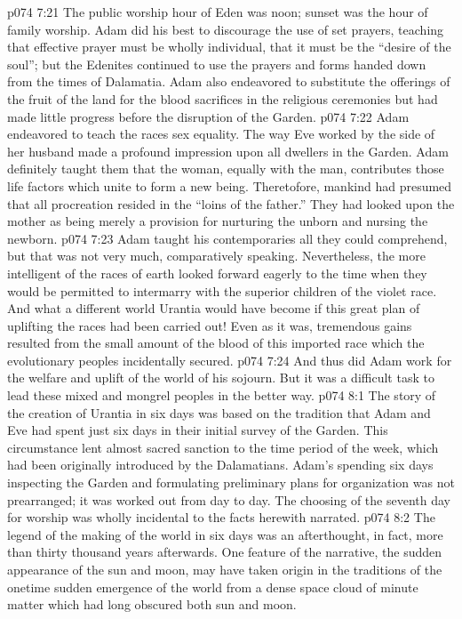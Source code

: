 \vs p074 7:21 The public worship hour of Eden was noon; sunset was the hour of family worship. Adam did his best to discourage the use of set prayers, teaching that effective prayer must be wholly individual, that it must be the “desire of the soul”; but the Edenites continued to use the prayers and forms handed down from the times of Dalamatia. Adam also endeavored to substitute the offerings of the fruit of the land for the blood sacrifices in the religious ceremonies but had made little progress before the disruption of the Garden.
\pc \vs p074 7:22 Adam endeavored to teach the races sex equality. The way Eve worked by the side of her husband made a profound impression upon all dwellers in the Garden. Adam definitely taught them that the woman, equally with the man, contributes those life factors which unite to form a new being. Theretofore, mankind had presumed that all procreation resided in the “loins of the father.” They had looked upon the mother as being merely a provision for nurturing the unborn and nursing the newborn.\plusone
\vs p074 7:23 Adam taught his contemporaries all they could comprehend, but that was not very much, comparatively speaking. Nevertheless, the more intelligent of the races of earth looked forward eagerly to the time when they would be permitted to intermarry with the superior children of the violet race. And what a different world Urantia would have become if this great plan of uplifting the races had been carried out! Even as it was, tremendous gains resulted from the small amount of the blood of this imported race which the evolutionary peoples incidentally secured.\plusone
\vs p074 7:24 And thus did Adam work for the welfare and uplift of the world of his sojourn. But it was a difficult task to lead these mixed and mongrel peoples in the better way.
\vs p074 8:1 The story of the creation of Urantia in six days was based on the tradition that Adam and Eve had spent just six days in their initial survey of the Garden. This circumstance lent almost sacred sanction to the time period of the week, which had been originally introduced by the Dalamatians. Adam’s spending six days inspecting the Garden and formulating preliminary plans for organization was not prearranged; it was worked out from day to day. The choosing of the seventh day for worship was wholly incidental to the facts herewith narrated.
\vs p074 8:2 The legend of the making of the world in six days was an afterthought, in fact, more than thirty thousand years afterwards. One feature of the narrative, the sudden appearance of the sun and moon, may have taken origin in the traditions of the onetime sudden emergence of the world from a dense space cloud of minute matter which had long obscured both sun and moon.
